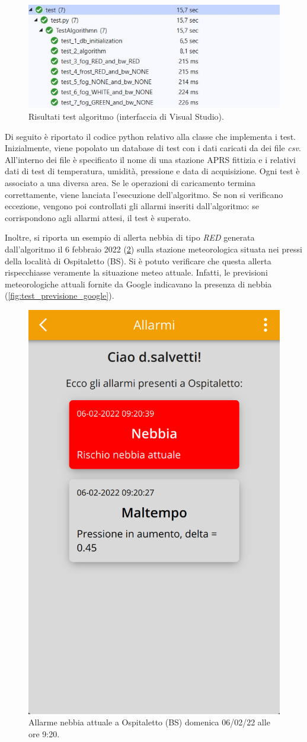 \begin{figure}[h!]
	\centering
	\includegraphics[width=1\linewidth]{./Iterazione 3/ImageFiles/TestResultAlgorithm}
	\caption{Risultati test algoritmo (interfaccia di Visual Studio).}
	\label{fig:test_result_alg}
\end{figure}

Di seguito è riportato il codice python relativo alla classe che implementa i test. Inizialmente, viene popolato un database di test con i dati caricati da dei file \textit{csv}. All'interno dei file è specificato il nome di una stazione APRS fittizia e i relativi dati di test di temperatura, umidità, pressione e data di acquisizione. Ogni test è associato a una diversa area.  Se le operazioni di caricamento termina correttamente, viene lanciata l'esecuzione dell'algoritmo. Se non si verificano eccezione, vengono poi controllati gli allarmi inseriti dall'algoritmo: se corrispondono agli allarmi attesi, il test è superato.

\begingroup
\UseRawInputEncoding

\endgroup

Inoltre, si riporta un esempio di allerta nebbia di tipo \textit{RED} generata dall'algoritmo il 6 febbraio 2022 (\Fig\ref{fig:test_previsione_alg}) sulla stazione meteorologica situata nei pressi della località di Ospitaletto (BS). Si è potuto verificare che questa allerta rispecchiasse veramente la situazione meteo attuale. Infatti, le previsioni meteorologiche attuali fornite da Google indicavano la presenza di nebbia (\Fig\ref{fig:test_previsione_google}).

\begin{figure}[h!]
	\centering
	\includegraphics[width=0.3\linewidth]{./Iterazione 3/ImageFiles/testAppRedFog}
	\caption{Allarme nebbia attuale a Ospitaletto (BS) domenica 06/02/22 alle ore 9:20.}
	\label{fig:test_previsione_alg}
\end{figure}

